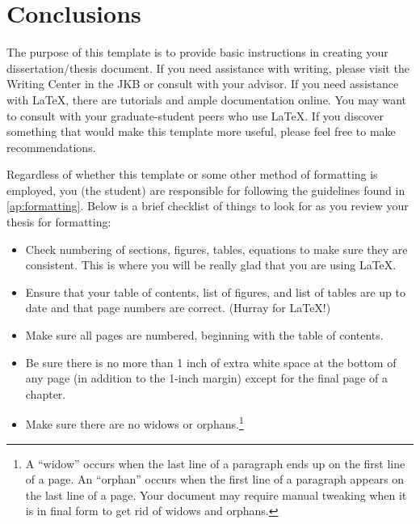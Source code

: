\chapter{Conclusions}

The purpose of this template is to provide basic instructions in creating your 
dissertation/thesis document. If you need assistance with writing, please visit the
Writing Center in the JKB or consult with your advisor. If you need assistance with
\LaTeX, there are tutorials and ample documentation online. You may want to consult
with your graduate-student peers who use \LaTeX. If you discover something that would
make this template more useful, please feel free to make recommendations.

Regardless of whether this template or some other method of formatting is employed, 
you (the student) are responsible for following the guidelines found in \cref{ap:formatting}. 
Below is a brief checklist of things to look for as you review your thesis for formatting:
\begin{itemize}
	\item Check numbering of sections, figures, tables, equations to make sure they are consistent.	This is where you will be really glad that you are using \LaTeX.
	\item Ensure that your table of contents, list of figures, and list of tables are up to date and that page numbers are correct. (Hurray for \LaTeX!)
	\item Make sure all pages are numbered, beginning with the table of contents.
	\item Be sure there is no more than 1 inch of extra white space at the bottom of any page (in addition to the 1-inch margin) except for the final page of a chapter.
	\item Make sure there are no widows or orphans.\footnote{A ``widow'' occurs when the last line of a paragraph ends up on the first line of a page. An ``orphan'' occurs when the first line of a paragraph appears on the last line of a page. Your document may require manual tweaking when it is in final form to get rid of widows and orphans.}
\end{itemize}

